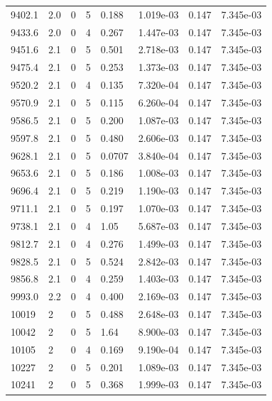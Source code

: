 \documentclass[preview]{standalone}
\begin{document}
{{{{{{{{{{{{{{{{\begin{tabular}{L{1.2cm}C{1.2cm} C{0.3cm}C{0.5cm} C{1.4cm}C{1.4cm} C{1.4cm}C{1.4cm}}
  9402.1  &   2.0  & 0     &  5 &  0.188  & 1.019e-03  & 0.147 &  7.345e-03   \\ 
  9433.6  &   2.0  & 0     &  4 &  0.267  & 1.447e-03  & 0.147 &  7.345e-03   \\ 
  9451.6  &   2.1  & 0     &  5 &  0.501  & 2.718e-03  & 0.147 &  7.345e-03   \\ 
  9475.4  &   2.1  & 0     &  5 &  0.253  & 1.373e-03  & 0.147 &  7.345e-03   \\ 
  9520.2  &   2.1  & 0     &  4 &  0.135  & 7.320e-04  & 0.147 &  7.345e-03   \\ 
  9570.9  &   2.1  & 0     &  5 &  0.115  & 6.260e-04  & 0.147 &  7.345e-03   \\ 
  9586.5  &   2.1  & 0     &  5 &  0.200  & 1.087e-03  & 0.147 &  7.345e-03   \\ 
  9597.8  &   2.1  & 0     &  5 &  0.480  & 2.606e-03  & 0.147 &  7.345e-03   \\ 
  9628.1  &   2.1  & 0     &  5 &  0.0707  & 3.840e-04  & 0.147 &  7.345e-03   \\ 
  9653.6  &   2.1  & 0     &  5 &  0.186  & 1.008e-03  & 0.147 &  7.345e-03   \\ 
  9696.4  &   2.1  & 0     &  5 &  0.219  & 1.190e-03  & 0.147 &  7.345e-03   \\ 
  9711.1  &   2.1  & 0     &  5 &  0.197  & 1.070e-03  & 0.147 &  7.345e-03   \\ 
  9738.1  &   2.1  & 0     &  4 &  1.05  & 5.687e-03  & 0.147 &  7.345e-03   \\ 
  9812.7  &   2.1  & 0     &  4 &  0.276  & 1.499e-03  & 0.147 &  7.345e-03   \\ 
  9828.5  &   2.1  & 0     &  5 &  0.524  & 2.842e-03  & 0.147 &  7.345e-03   \\ 
  9856.8  &   2.1  & 0     &  4 &  0.259  & 1.403e-03  & 0.147 &  7.345e-03   \\ 
  9993.0  &   2.2  & 0     &  4 &  0.400  & 2.169e-03  & 0.147 &  7.345e-03   \\ 
  10019  &     2  & 0     &  5 &  0.488  & 2.648e-03  & 0.147 &  7.345e-03   \\ 
  10042  &     2  & 0     &  5 &  1.64  & 8.900e-03  & 0.147 &  7.345e-03   \\ 
  10105  &     2  & 0     &  4 &  0.169  & 9.190e-04  & 0.147 &  7.345e-03   \\ 
  10227  &     2  & 0     &  5 &  0.201  & 1.089e-03  & 0.147 &  7.345e-03   \\ 
  10241  &     2  & 0     &  5 &  0.368  & 1.999e-03  & 0.147 &  7.345e-03   \\ 

\end{tabular}}}}}}}}}}}}}}}}}
\end{document}

